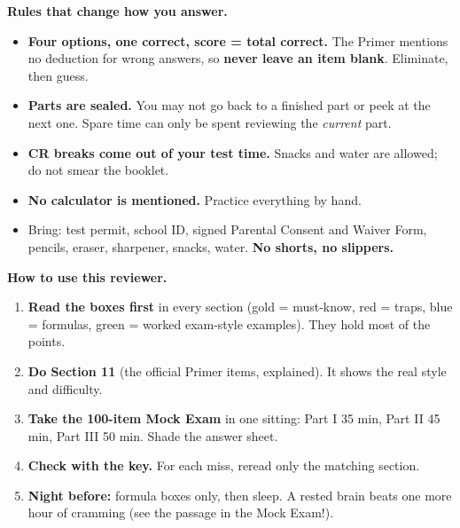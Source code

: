 \documentclass[10pt]{article}
\begin{document}
\noindent
\begin{minipage}[t]{0.495\textwidth}
\begin{tcolorbox}[enhanced, colback=palegold, colframe=dgold, boxrule=0pt, leftrule=3pt, sharp corners,
  left=5pt, right=5pt, top=2pt, bottom=2pt, before skip=0pt, after skip=0pt, equal height group=intro]
{\sffamily\bfseries\color{dgold!55!black}Rules that change how you answer.}
\begin{itemize}
\item \textbf{Four options, one correct, score = total correct.} The Primer mentions no deduction for wrong answers, so \textbf{never leave an item blank}. Eliminate, then guess.
\item \textbf{Parts are sealed.} You may not go back to a finished part or peek at the next one. Spare time can only be spent reviewing the \emph{current} part.
\item \textbf{CR breaks come out of your test time.} Snacks and water are allowed; do not smear the booklet.
\item \textbf{No calculator is mentioned.} Practice everything by hand.
\item Bring: test permit, school ID, signed Parental Consent and Waiver Form, pencils, eraser, sharpener, snacks, water. \textbf{No shorts, no slippers.}
\end{itemize}
\end{tcolorbox}
\end{minipage}\hfill
\begin{minipage}[t]{0.495\textwidth}
\begin{tcolorbox}[enhanced, colback=dmist, colframe=dblue!55, boxrule=0.5pt, arc=2pt,
  left=5pt, right=5pt, top=2pt, bottom=2pt, before skip=0pt, after skip=0pt, equal height group=intro]
{\sffamily\bfseries\color{dblue}How to use this reviewer.}
\begin{enumerate}[leftmargin=1.2em]
\item \textbf{Read the boxes first} in every section (gold = must-know, red = traps, blue = formulas, green = worked exam-style examples). They hold most of the points.
\item \textbf{Do Section 11} (the official Primer items, explained). It shows the real style and difficulty.
\item \textbf{Take the 100-item Mock Exam} in one sitting: Part I 35 min, Part II 45 min, Part III 50 min. Shade the answer sheet.
\item \textbf{Check with the key.} For each miss, reread only the matching section.
\item \textbf{Night before:} formula boxes only, then sleep. A rested brain beats one more hour of cramming (see the passage in the Mock Exam!).
\end{enumerate}
\end{tcolorbox}
\end{minipage}
\vspace{4pt}
\end{document}

